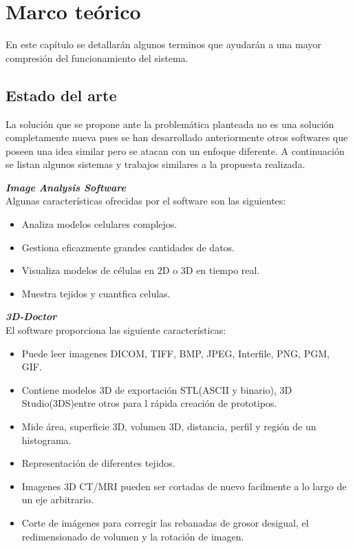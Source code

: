 \documentclass[12pt]{report}
\begin{document}
\chapter{Marco teórico}
En este capítulo se detallarán algunos terminos que ayudarán a una mayor compresión del funcionamiento del sistema.
\section{Estado del arte}
La solución que se propone ante la problemática planteada no es una solución completamente nueva pues se han desarrollado anteriormente otros softwares que poseen una idea similar pero se atacan con un enfoque diferente. A continuación se listan algunos sistemas y trabajos similares a la propuesta realizada.

\hfill\break
\textbf{\textit{Image Analysis Software}}
\\Algunas características ofrecidas por el software son las siguientes:
\begin{itemize}
\item Analiza modelos celulares complejos.
\item Gestiona eficazmente grandes cantidades de datos.
\item Visualiza modelos de células en 2D o 3D en tiempo real.
\item Muestra tejidos y cuantfica celulas.
\end{itemize}

\hfill\break
\textbf{\textit{3D-Doctor}}
\\El software proporciona las siguiente características:
\begin{itemize}
\item Puede leer imagenes DICOM, TIFF, BMP, JPEG, Interfile, PNG, PGM, GIF.
\item Contiene modelos 3D de exportación STL(ASCII y binario), 3D Studio(3DS)entre otros para l rápida creación de prototipos.
\item Mide área, superficie 3D, volumen 3D, distancia, perfil y región de un histograma.
\item Representación de diferentes tejidos.
\item Imagenes 3D CT/MRI pueden ser cortadas de nuevo facilmente a lo largo de un eje arbitrario.
\item Corte de imágenes para corregir las rebanadas de grosor desigual, el redimensionado de volumen y la rotación de imagen.
\end{itemize}
\end{document}
